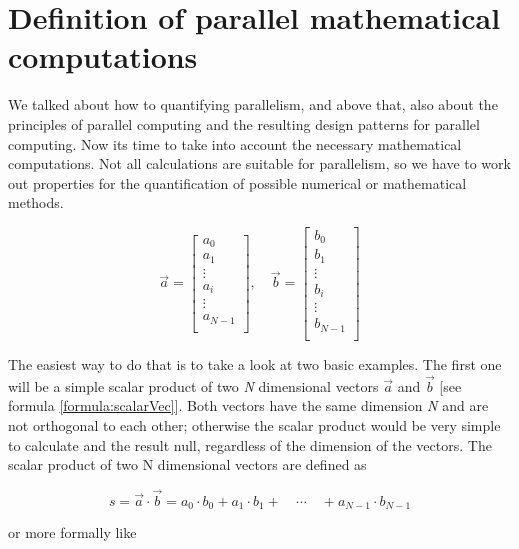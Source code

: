 \section{Definition of parallel mathematical computations}\label{chap:mathComp}

We talked about how to quantifying parallelism, and above that, also about the principles of parallel computing and the resulting design patterns for parallel computing. Now its time to take into account the necessary mathematical computations. Not all calculations are suitable for parallelism, so we have to work out properties for the quantification of possible numerical or mathematical methods. 

\begin{equation} \label{formula:scalarVec}
\vec{a} = \begin{bmatrix}
a_{0} \\
a_{1} \\
\vdots \\
a_{i} \\
\vdots \\
a_{N - 1} \\
\end{bmatrix} ,\quad \vec{b} = \begin{bmatrix}
b_{0} \\
b_{1} \\
\vdots \\
b_{i} \\
\vdots \\
b_{N - 1} \\
\end{bmatrix}
\end{equation}

The easiest way to do that is to take a look at two basic examples. The first one will be a simple scalar product of two \textit{N} dimensional vectors $\vec{a}$ and $\vec{b}$ [see formula \ref{formula:scalarVec}]. Both vectors have the same dimension \textit{N} and are not orthogonal to each other; otherwise the scalar product would be very simple to calculate and the result null, regardless of the dimension of the vectors. The scalar product of two N dimensional vectors are defined as

\begin{equation} \label{formula:scalarProdEasy}
	s = \vec{a} \cdot \vec{b} = a_0 \cdot b_0 + a_1 \cdot b_1 + \quad \cdots \quad + a_{N - 1} \cdot b_{N - 1}
\end{equation}

\noindent or more formally like

